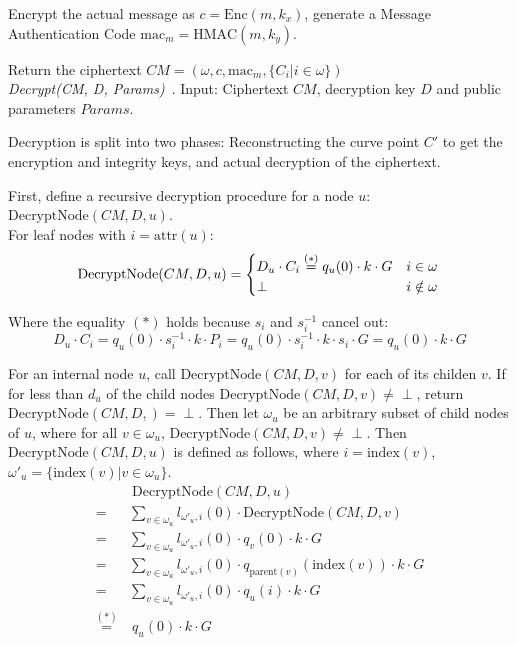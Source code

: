 Encrypt the actual message as $c = \text{Enc}(m, k_x)$, generate a Message Authentication Code $\text{mac}_m = \text{HMAC}(m, k_y)$.

Return the ciphertext $CM = (\omega, c, \text{mac}_m, \{C_i | i \in \omega\})$\\

\emph{Decrypt(CM, D, Params)}~\cite{yao_lightweight_2015}. Input: Ciphertext $CM$, decryption key $D$ and public parameters $Params$.

Decryption is split into two phases: Reconstructing the curve point $C'$ to get the encryption and integrity keys, and actual decryption of the ciphertext.

First, define a recursive decryption procedure for a node $u$: $\text{DecryptNode}(CM, D, u)$. \\ %
For leaf nodes with $i = \text{attr}(u)$:
\begin{equation*}
    \text{DecryptNode}(CM, D, u) = \begin{cases}
        D_u \cdot C_i \stackrel{(*)}{=} q_u(0) \cdot k \cdot G & i \in \omega\\
        \perp & i \notin \omega
    \end{cases}\\
\end{equation*}

Where the equality $(*)$ holds because $s_i$ and $s_i^{-1}$ cancel out: 
\begin{equation*}
    D_u \cdot C_i = q_u(0) \cdot s_i^{-1} \cdot k \cdot P_i = q_u(0) \cdot s_i^{-1} \cdot k \cdot s_i \cdot G = q_u(0) \cdot k \cdot G
\end{equation*}

For an internal node $u$, call $\text{DecryptNode}(CM, D, v)$ for each of its childen $v$. If for less than $d_u$ of the child nodes $\text{DecryptNode}(CM, D, v) \neq \perp$, return $\text{DecryptNode}(CM, D, )=\perp$.
Then let $\omega_u$ be an arbitrary subset of child nodes of $u$, where for all $v \in \omega_u$, $\text{DecryptNode}(CM, D, v) \neq \perp$.
Then $\text{DecryptNode}(CM, D, u)$ is defined as follows, where $i = \text{index}(v)$, $\omega'_u = \{\text{index}(v) | v \in \omega_u\}$.
\begin{equation*}
    \begin{split}
        &~\text{DecryptNode}(CM, D, u)\\
        =& \sum_{v \in \omega_u} l_{\omega'_u, i}(0) \cdot \text{DecryptNode}(CM, D, v)\\
        =& \sum_{v \in \omega_u} l_{\omega'_u, i}(0) \cdot q_v(0) \cdot k \cdot G\\
        =& \sum_{v \in \omega_u} l_{\omega'_u, i}(0) \cdot q_{\text{parent}(v)}(\text{index}(v)) \cdot k \cdot G\\
        =& \sum_{v \in \omega_u} l_{\omega'_u, i}(0) \cdot q_u(i) \cdot k \cdot G\\
        \stackrel{(*)}{=}&~q_u(0) \cdot k \cdot G
    \end{split}
\end{equation*}


